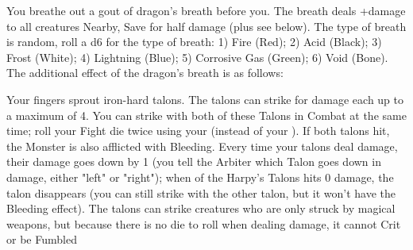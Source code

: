 {\newpage

\MYSTERY [
  Name = Dragonbreath,
  Link = arcana-mystery-dragonbreath,
  Paradigm = Elements,
  Save = Y (half),
  Duration = Instant,
  Target = Nearby
]

You breathe out a gout of dragon's breath before you.  The breath deals \SUMDICE+\DICE damage to all creatures Nearby, Save for half damage (plus see below).  The type of breath is random, roll a d6 for the type of breath: 1) Fire (Red); 2) Acid (Black); 3) Frost (White); 4) Lightning (Blue); 5) Corrosive Gas (Green); 6) Void (Bone).  The additional effect of the dragon's breath is as follows:


\MYSTERY [
  Name = Harpy's Talons,
  Link = arcana-mystery-harpys-talons,
  Paradigm = Force,
  Save = n/a,
  Duration = Session,
  Target = Self
]

Your fingers sprout iron-hard talons.  The talons can strike for \DICE damage each up to a maximum of 4.  You can strike with both of these Talons in Combat at the same time; roll your Fight die twice using your \FOC (instead of your \VIG).  If both talons hit, the Monster is also afflicted with Bleeding.  Every time your talons deal damage, their damage goes down by 1 (you tell the Arbiter which Talon goes down in damage, either "left" or "right"); when  of the Harpy's Talons hits 0 damage, the talon disappears (you can still strike with the other talon, but it won't have the Bleeding effect). The talons can strike creatures who are only struck by magical weapons, but because there is no die to roll when dealing damage, it cannot Crit or be Fumbled

}
